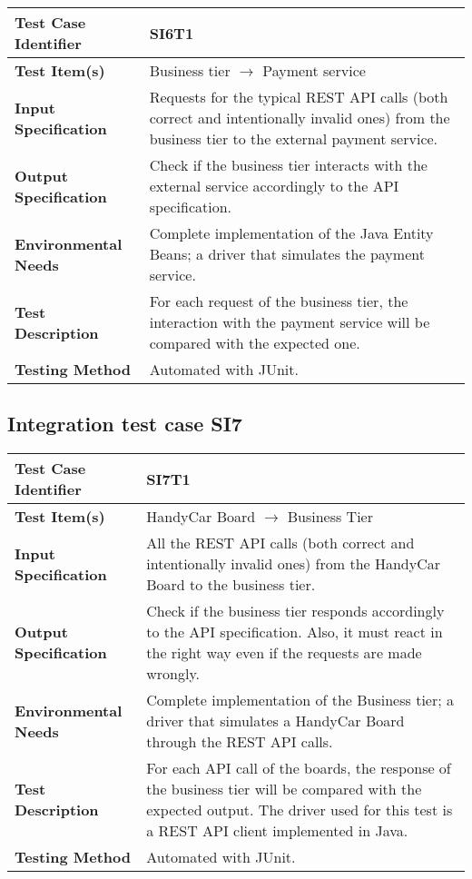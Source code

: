 \begin{tabular}{l p{}}
    \hline
    \textbf{Test Case Identifier} & SI6T1\\
    \hline
    \textbf{Test Item(s)} & Business tier $\rightarrow$ Payment service\\
    \hline
    \textbf{Input Specification} & Requests for the typical REST API calls (both correct and intentionally invalid ones) from the business tier to the external payment service.\\
    \hline
    \textbf{Output Specification} & Check if the business tier interacts with the external service accordingly to the API specification.\\
    \hline
    \textbf{Environmental Needs} & Complete implementation of the Java Entity Beans; a driver that simulates the payment service.\\
    \hline
    \textbf{Test Description} & For each request of the business tier, the interaction with the payment service will be compared with the expected one.\\
    \hline
    \textbf{Testing Method} & Automated with JUnit.\\
    \hline
\end{tabular}

\vspace{2em}

\subsection{Integration test case SI7}
\label{sec:performance-business}

\begin{tabular}{l p{}}
    \hline
    \textbf{Test Case Identifier} & SI7T1\\
    \hline
    \textbf{Test Item(s)} & HandyCar Board $\rightarrow$ Business Tier\\
    \hline
    \textbf{Input Specification} & All the REST API calls (both correct and intentionally invalid ones) from the HandyCar Board to the business tier.\\
    \hline
    \textbf{Output Specification} & Check if the business tier responds accordingly to the API specification. Also, it must react in the right way even if the requests are made wrongly.\\
    \hline
    \textbf{Environmental Needs} & Complete implementation of the Business tier; a driver that simulates a HandyCar Board through the REST API calls. \\
    \hline
    \textbf{Test Description} & For each API call of the boards, the response of the business tier will be compared with the expected output. The driver used for this test is a REST API client implemented in Java.\\
    \hline
    \textbf{Testing Method} & Automated with JUnit.\\
    \hline
\end{tabular}

